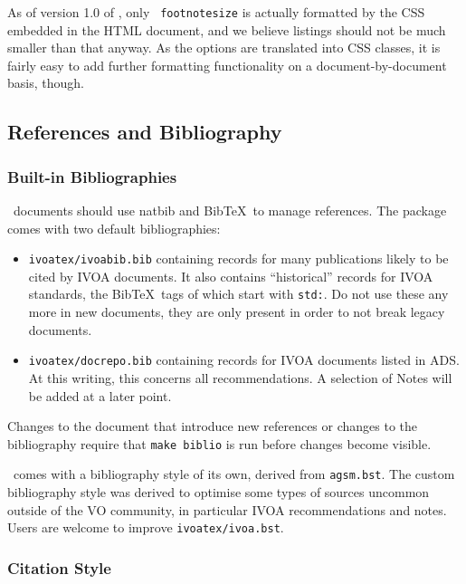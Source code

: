 \documentclass[11pt,a4paper]{ivoa}
\newcommand{\texword}[1]{\texttt{\color{texcolor} #1}}
\newcommand{\BibTeX}{BibTeX}
\begin{document}


As of version 1.0 of \ivoatex, only \texword{footnotesize} is actually
formatted by the CSS embedded in the HTML document, and we believe
listings should not be much smaller than that anyway.  As the options
are translated into CSS classes, it is fairly easy to add further
formatting functionality on a document-by-document basis, though.

\subsection{References and Bibliography}

\subsubsection{Built-in Bibliographies}
\ivoatex\ documents should use natbib and \BibTeX\ to manage references.
The package comes with two default bibliographies:

\begin{itemize}
\item \texttt{ivoatex/ivoabib.bib} containing records for many publications
likely to be cited by IVOA documents.  It also contains ``historical''
records for IVOA standards, the \BibTeX\ tags of which start with
\texttt{std:}.  Do not use these any more in new documents, they are
only present in order to not break legacy documents.
\item\texttt{ivoatex/docrepo.bib} containing records for IVOA documents
listed in ADS.  At this writing, this concerns all recommendations.  A
selection of Notes will be added at a later point.
\end{itemize}

Changes to the document that introduce new references or changes to the
bibliography require that \texttt{make biblio} is run before changes
become visible.

\ivoatex\ comes with a bibliography style of its own, derived from
\texttt{agsm.bst}.  The custom bibliography style was derived to
optimise some types of sources uncommon outside of the VO community, in
particular IVOA recommendations and notes.  Users are welcome to improve
\texttt{ivoatex/ivoa.bst}.

\subsubsection{Citation Style}
\end{document}
